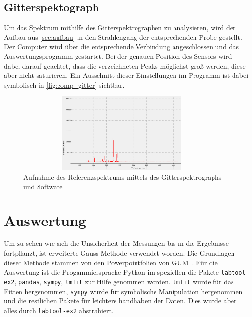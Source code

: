 \documentclass[12pt,english,ngerman]{scrartcl}
\begin{document}
\subsection{Gitterspektograph}

Um das Spektrum mithilfe des Gitterspektrographen zu analysieren, wird der
Aufbau aus \autoref{sec:aufbau} in den Strahlengang der entsprechenden Probe
gestellt. Der Computer wird über die entsprechende Verbindung angeschlossen und
das Auswertungsprogramm gestartet. Bei der genauen Position des Sensors wird
dabei darauf geachtet, dass die verzeichneten Peaks möglichst groß werden,
diese aber nicht saturieren. Ein Ausschnitt dieser Einstellungen im Programm
ist dabei symbolisch in \autoref{fig:comp_gitter} sichtbar.

\begin{figure}[H]
	\begin{center}
		\includegraphics[width=0.95\textwidth, height=4cm]{figures/gitterSpektComp.png}
	\end{center}
	\caption{Aufnahme des Referenzspektrums mittels des Gitterspektrographs und Software
	}\label{fig:comp_gitter}
\end{figure}

\section{Auswertung}\label{sec:auswertung}

Um zu sehen wie sich die Unsicherheit der Messungen bis in die Ergebnisse
fortpflanzt, ist erweiterte Gauss-Methode verwendet worden. Die Grundlagen
dieser Methode stammen von den Powerpointfolien von
GUM~\cite{wolfgang_kessel_isobipm-gum_2004}. Für die Auswertung ist die
Progammiersprache Python im speziellen die Pakete \verb#labtool-ex2#,
\verb#pandas#, \verb#sympy#, \verb#lmfit# zur Hilfe genommen worden.
\verb#lmfit# wurde für das Fitten hergenommen, \verb#sympy# wurde für
symbolische Manipulation hergenommen und die restlichen Pakete für leichters
handhaben der Daten. Dies wurde aber alles durch \verb#labtool-ex2#
abstrahiert.
\end{document}
